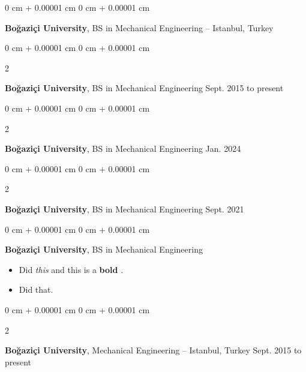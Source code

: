 \documentclass[10pt, letterpaper]{article}
\newenvironment{highlights}{
    \begin{itemize}[
        topsep=0.10 cm,
        parsep=0.10 cm,
        partopsep=0pt,
        itemsep=0pt,
        leftmargin=0 cm + 10pt
    ]
}{
    \end{itemize}
} %
\newenvironment{onecolentry}{
    \begin{adjustwidth}{
        0 cm + 0.00001 cm
    }{
        0 cm + 0.00001 cm
    }
}{
    \end{adjustwidth}
} %
\newenvironment{twocolentry}[2][]{
    \onecolentry
    \def\secondColumn{#2}
    \setcolumnwidth{\fill, 4.2cm}
    \begin{paracol}{2}
}{
    \switchcolumn \raggedleft \secondColumn
    \end{paracol}
    \endonecolentry
} %
\let\hrefWithoutArrow\href
\renewcommand{\href}[2]{\hrefWithoutArrow{#1}{\mbox{\ifthenelse{\equal{#2}{}}{ }{#2 }\raisebox{.15ex}{\footnotesize \faExternalLink*}}}}
\begin{document}
        \begin{onecolentry}
            \textbf{Boğaziçi University}, BS in Mechanical Engineering -- Istanbul, Turkey\end{onecolentry}


        \vspace{0.1 cm}

        \begin{twocolentry}{
            Sept. 2015 to present
        }
            \textbf{Boğaziçi University}, BS in Mechanical Engineering\end{twocolentry}


        \vspace{0.1 cm}

        \begin{twocolentry}{
            Jan. 2024
        }
            \textbf{Boğaziçi University}, BS in Mechanical Engineering\end{twocolentry}


        \vspace{0.1 cm}

        \begin{twocolentry}{
            Sept. 2021
        }
            \textbf{Boğaziçi University}, BS in Mechanical Engineering\end{twocolentry}


        \vspace{0.1 cm}

        \begin{onecolentry}
            \textbf{Boğaziçi University}, BS in Mechanical Engineering    \begin{highlights}
                \item Did \textit{this} and this is a \textbf{bold} \href{https://example.com}{link}.
                \item Did that.
            \end{highlights}
        \end{onecolentry}


        \vspace{0.1 cm}

        \begin{twocolentry}{
            Sept. 2015 to present
        }
            \textbf{Boğaziçi University}, Mechanical Engineering -- Istanbul, Turkey\end{twocolentry}


        \vspace{0.1 cm}
\end{document}
